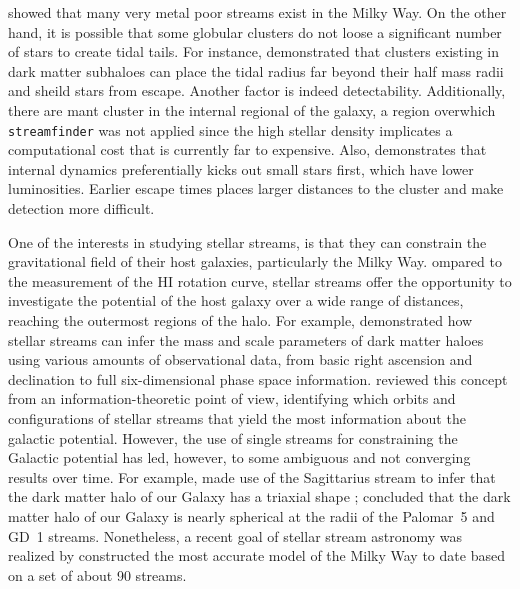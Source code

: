 \documentclass{aa}
\begin{document}
  \citet{2022MNRAS.516.5331M} showed that many very metal poor streams exist in the Milky Way. On the other hand, it is possible that some globular clusters do not loose a significant number of stars to create tidal tails. For instance, \citet{2022A&A...667A.112V} demonstrated that clusters existing in dark matter subhaloes can place the tidal radius far beyond their half mass radii and sheild stars from escape. Another factor is indeed detectability. Additionally, there are mant cluster in the internal regional of the galaxy, a region overwhich \texttt{streamfinder} was not applied since the high stellar density implicates a computational cost that is currently far to expensive. Also, \citet{2018MNRAS.474.2479B} demonstrates that internal dynamics preferentially kicks out small stars first, which have lower luminosities. Earlier escape times places larger distances to the cluster and make detection more difficult. 
  
  
  One of the interests in studying stellar streams, is that they can constrain the gravitational field of their host galaxies, particularly the Milky Way. ompared to the measurement of the HI rotation curve, stellar streams offer the opportunity to investigate the potential of the host galaxy over a wide range of distances, reaching the outermost regions of the halo. For example, \citet{2011MNRAS.417..198V} demonstrated how stellar streams can infer the mass and scale parameters of dark matter haloes using various amounts of observational data, from basic right ascension and declination to full six-dimensional phase space information. \citet{2018ApJ...867..101B} reviewed this concept from an information-theoretic point of view, identifying which orbits and configurations of stellar streams that yield the most information about the galactic potential. However, the use of single streams for constraining the Galactic potential has led, however, to some ambiguous and not converging results over time. For example, \citet{2010ApJ...718.1128L} made use of the Sagittarius stream to infer that the dark matter halo of our Galaxy has a triaxial shape \citep[but see also][]{2004MNRAS.351..643H, johnston05, 2005ApJ...619..807L}; \citet{2016ApJ...833...31B} concluded that the dark matter halo of our Galaxy is nearly spherical at the radii of the Palomar~5 and GD~1 streams. Nonetheless, a recent goal of stellar stream astronomy was realized by \citet{2024ApJ...967...89I} constructed the most accurate model of the Milky Way to date based on a set of about 90 streams. 
\end{document}

